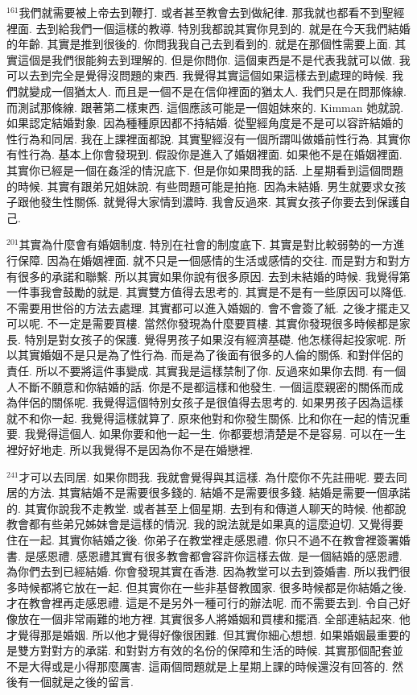 \documentclass{book}
\begin{document}
$^{161}$我們就需要被上帝去到鞭打.
或者甚至教會去到做紀律.
那我就也都看不到聖經裡面.
去到給我們一個這樣的教導.
特別我都說其實你見到的.
就是在今天我們結婚的年齡.
其實是推到很後的.
你問我我自己去到看到的.
就是在那個性需要上面.
其實這個是我們很能夠去到理解的.
但是你問你.
這個東西是不是代表我就可以做.
我可以去到完全是覺得沒問題的東西.
我覺得其實這個如果這樣去到處理的時候.
我們就變成一個猶太人.
而且是一個不是在信仰裡面的猶太人.
我們只是在問那條線.
而測試那條線.
跟著第二樣東西.
這個應該可能是一個姐妹來的.
Kimman 她就說.
如果認定結婚對象.
因為種種原因都不持結婚.
從聖經角度是不是可以容許結婚的性行為和同居.
我在上課裡面都說.
其實聖經沒有一個所謂叫做婚前性行為.
其實你有性行為.
基本上你會發現到.
假設你是進入了婚姻裡面.
如果他不是在婚姻裡面.
其實你已經是一個在姦淫的情況底下.
但是你如果問我的話.
上星期看到這個問題的時候.
其實有跟弟兄姐妹說.
有些問題可能是拍拖.
因為未結婚.
男生就要求女孩子跟他發生性關係.
就覺得大家情到濃時.
我會反過來.
其實女孩子你要去到保護自己.

$^{201}$其實為什麼會有婚姻制度.
特別在社會的制度底下.
其實是對比較弱勢的一方進行保障.
因為在婚姻裡面.
就不只是一個感情的生活或感情的交往.
而是對方和對方有很多的承諾和聯繫.
所以其實如果你說有很多原因.
去到未結婚的時候.
我覺得第一件事我會鼓勵的就是.
其實雙方值得去思考的.
其實是不是有一些原因可以降低.
不需要用世俗的方法去處理.
其實都可以進入婚姻的.
會不會簽了紙.
之後才擺走又可以呢.
不一定是需要買樓.
當然你發現為什麼要買樓.
其實你發現很多時候都是家長.
特別是對女孩子的保護.
覺得男孩子如果沒有經濟基礎.
他怎樣得起投家呢.
所以其實婚姻不是只是為了性行為.
而是為了後面有很多的人倫的關係.
和對伴侶的責任.
所以不要將這件事變成.
其實我是這樣禁制了你.
反過來如果你去問.
有一個人不斷不願意和你結婚的話.
你是不是都這樣和他發生.
一個這麼親密的關係而成為伴侶的關係呢.
我覺得這個特別女孩子是很值得去思考的.
如果男孩子因為這樣就不和你一起.
我覺得這樣就算了.
原來他對和你發生關係.
比和你在一起的情況重要.
我覺得這個人.
如果你要和他一起一生.
你都要想清楚是不是容易.
可以在一生裡好好地走.
所以我覺得不是因為你不是在婚戀裡.

$^{241}$才可以去同居.
如果你問我.
我就會覺得與其這樣.
為什麼你不先註冊呢.
要去同居的方法.
其實結婚不是需要很多錢的.
結婚不是需要很多錢.
結婚是需要一個承諾的.
其實你說我不走教堂.
或者甚至上個星期.
去到有和傳道人聊天的時候.
他都說教會都有些弟兄姊妹會是這樣的情況.
我的說法就是如果真的這麼迫切.
又覺得要住在一起.
其實你結婚之後.
你弟子在教堂裡走感恩禮.
你只不過不在教會裡簽署婚書.
是感恩禮.
感恩禮其實有很多教會都會容許你這樣去做.
是一個結婚的感恩禮.
為你們去到已經結婚.
你會發現其實在香港.
因為教堂可以去到簽婚書.
所以我們很多時候都將它放在一起.
但其實你在一些非基督教國家.
很多時候都是你結婚之後.
才在教會裡再走感恩禮.
這是不是另外一種可行的辦法呢.
而不需要去到.
令自己好像放在一個非常兩難的地方裡.
其實很多人將婚姻和買樓和擺酒.
全部連結起來.
他才覺得那是婚姻.
所以他才覺得好像很困難.
但其實你細心想想.
如果婚姻最重要的是雙方對對方的承諾.
和對對方有效的名份的保障和生活的時候.
其實那個配套並不是大得或是小得那麼厲害.
這兩個問題就是上星期上課的時候還沒有回答的.
然後有一個就是之後的留言.
\end{document}
